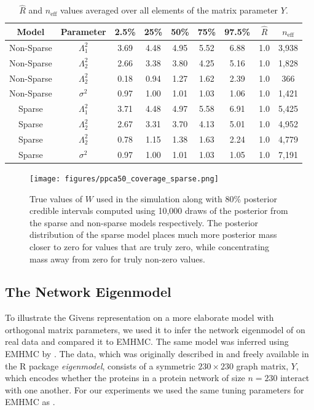 \documentclass[ba]{imsart}
\numberwithin{equation}{section}
\theoremstyle{plain}
\begin{document}
\begin{table}
\begin{tabular}{|cc||ccccccc|}
\hline
Model & Parameter & 2.5\% & 25\% & 50\% & 75\% & 97.5\% &  $\hat{R}$ & $n_{\mathrm{eff}}$\\
\hline
\hline
Non-Sparse & $\Lambda_1^2$  & 3.69 & 4.48 & 4.95 & 5.52 & 6.88 & 1.0 & 3,938\\
Non-Sparse & $\Lambda_2^2$  & 2.66 & 3.38 & 3.80 & 4.25 & 5.16 & 1.0 & 1,828\\
Non-Sparse & $\Lambda_2^2$  & 0.18 & 0.94 & 1.27 & 1.62 & 2.39 & 1.0 & 366 \\
Non-Sparse &  $\sigma^2$ & 0.97 & 1.00 & 1.01 & 1.03 & 1.06 & 1.0 & 1,421\\
\hline
Sparse & $\Lambda_1^2$  & 3.71 & 4.48 & 4.97 & 5.58 & 6.91 & 1.0 & 5,425\\
Sparse & $\Lambda_2^2$  & 2.67 & 3.31 & 3.70 & 4.13 & 5.01 & 1.0 & 4,952\\
Sparse & $\Lambda_2^2$  & 0.78 & 1.15 & 1.38 & 1.63 & 2.24 & 1.0 & 4,779 \\
Sparse &  $\sigma^2$ & 0.97 & 1.00 & 1.01 & 1.03 & 1.05 & 1.0 & 7,191\\
\hline
\end{tabular}
\caption{$\hat{R}$ and $n_{\mathrm{eff}}$ values averaged over all elements of the matrix parameter $Y$. }
\label{tab:ppca50_sparse}
\end{table}

\begin{figure}[h]
\centering
\vspace{.1in}
\texttt{[image: figures/ppca50\_coverage\_sparse.png]}
\vspace{.05in}
\caption{True values of $W$ used in the simulation along with 80\% posterior credible intervals computed using 10,000 draws of the posterior from the sparse and non-sparse models respectively. The posterior distribution of the sparse model places much more posterior mass closer to zero for values that are truly zero, while concentrating mass away from zero for truly non-zero values.}
\label{fig:ppca50_coverage_sparse}
\end{figure}

\subsection{The Network Eigenmodel}
To illustrate the Givens representation on a more elaborate model with orthogonal matrix parameters, we used it to infer the network eigenmodel of \cite{hoff2009simulation} on real data and compared it to EMHMC. The same model was inferred using EMHMC by \cite{byrne2013geodesic}. The data, which was originally described in \cite{butland2005interaction} and freely available in the R package \textit{eigenmodel}, consists of a symmetric $230 \times 230$ graph matrix, $Y$, which encodes whether the proteins in a protein network of size $n=230$ interact with one another. For our experiments we used the same tuning parameters for EMHMC as \cite{byrne2013geodesic}.
\end{document}

